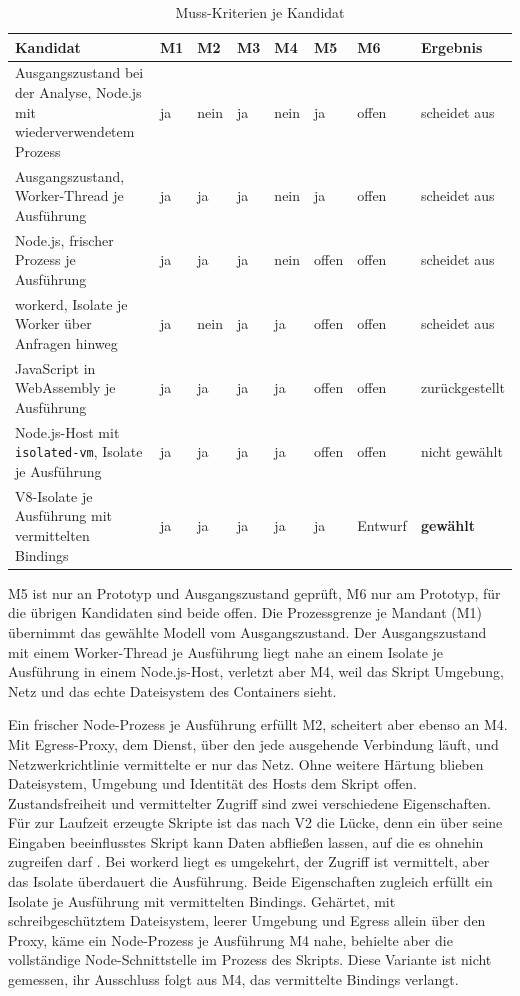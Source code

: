 \begin{table}[H]
\centering
\caption{Muss-Kriterien je Kandidat}
\label{tab:kandidaten}
\small
\begin{tabularx}{\textwidth}{@{}>{\RaggedRight\arraybackslash}X *{6}{>{\centering\arraybackslash}p{}} >{\RaggedRight\arraybackslash}p{}@{}}
\hline
Kandidat & M1 & M2 & M3 & M4 & M5 & M6 & Ergebnis \\
\hline
Ausgangszustand bei der Analyse, Node.js mit wiederverwendetem Prozess & ja & nein & ja & nein & ja & offen &
  scheidet aus \\
Ausgangszustand, Worker-Thread je Ausführung & ja & ja & ja & nein & ja & offen &
  scheidet aus \\
Node.js, frischer Prozess je Ausführung & ja & ja & ja & nein & offen & offen &
  scheidet aus \\
workerd, Isolate je Worker über Anfragen hinweg & ja & nein & ja & ja & offen & offen &
  scheidet aus \\
JavaScript in WebAssembly je Ausführung & ja & ja & ja & ja & offen & offen &
  zurückgestellt \\
Node.js-Host mit \texttt{isolated-vm}, Isolate je Ausführung & ja & ja & ja & ja & offen & offen &
  nicht gewählt \\
V8-Isolate je Ausführung mit vermittelten Bindings & ja & ja & ja & ja & ja & Entwurf &
  \textbf{gewählt} \\
\hline
\end{tabularx}
\end{table}

M5 ist nur an Prototyp und Ausgangszustand geprüft, M6 nur am Prototyp, für die übrigen Kandidaten sind beide offen. Die Prozessgrenze je Mandant (M1)
übernimmt das gewählte Modell vom Ausgangszustand. Der Ausgangszustand mit einem Worker-Thread je Ausführung liegt nahe
an einem Isolate je Ausführung in einem Node.js-Host, verletzt aber M4, weil das Skript Umgebung, Netz und das echte
Dateisystem des Containers sieht.

Ein frischer Node-Prozess je Ausführung erfüllt M2, scheitert aber ebenso an M4. Mit Egress-Proxy, dem Dienst, über
den jede ausgehende Verbindung läuft, und Netzwerkrichtlinie vermittelte er nur das Netz. Ohne weitere Härtung blieben
Dateisystem, Umgebung und Identität des Hosts dem Skript offen. Zustandsfreiheit und vermittelter Zugriff sind zwei verschiedene
Eigenschaften. Für zur Laufzeit erzeugte Skripte ist das nach V2 die Lücke, denn ein über seine Eingaben
beeinflusstes Skript kann Daten abfließen lassen, auf die es ohnehin zugreifen darf
\autocite[S.~82]{greshake_not_2023}. Bei workerd liegt es umgekehrt, der Zugriff ist vermittelt, aber das Isolate
überdauert die Ausführung. Beide Eigenschaften zugleich erfüllt ein Isolate je Ausführung mit vermittelten
Bindings. Gehärtet, mit schreibgeschütztem Dateisystem, leerer Umgebung und Egress allein über den Proxy, käme ein
Node-Prozess je Ausführung M4 nahe, behielte aber die vollständige Node-Schnittstelle im Prozess des Skripts. Diese
Variante ist nicht gemessen, ihr Ausschluss folgt aus M4, das vermittelte Bindings verlangt.

